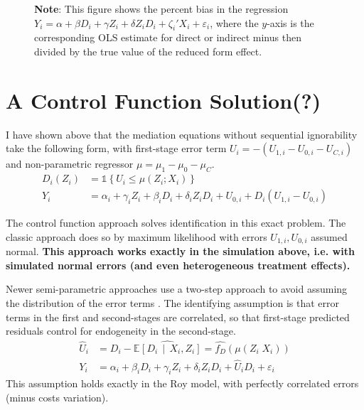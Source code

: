 \documentclass[a4paper, 12pt]{article}                                     %
\renewcommand{\vec}[1]{\boldsymbol{\mathit{#1}}}                           %
\newcommand{\Egiven}[3][]{\mathbb{E}_{#1} \left[ #2 \, \middle\vert \, #3 \right]} %
\newcommand{\indicator}[1]{\mathds{1}\left\{ #1 \right\}}                  %
\renewcommand{\hat}[1]{\widehat{#1}}                                       %
\begin{document}
\begin{figure}[H]
\begin{subfigure}[b]{0.495\textwidth}
        \label{fig:indirecteffect-bias}
    \end{subfigure}
    \label{fig:direct-indirect-effect-bias}
    \vspace{-1cm}
    \justify
    \footnotesize
    \textbf{Note}:
    This figure shows the percent bias in the regression $Y_i = \alpha + \beta D_i + \gamma Z_i + \delta Z_i D_i + \vec\zeta_i' \vec X_i + \varepsilon_i$, where the $y$-axis is the corresponding OLS estimate for direct or indirect minus then divided by the true value of the reduced form effect.
\end{figure}

\section{A Control Function Solution(?)}

I have shown above that the mediation equations without sequential ignorability take the following form, with first-stage error term $U_i = -( U_{1,i} - U_{0,i} - U_{C,i})$ and non-parametric regressor $\mu = \mu_1 - \mu_0 - \mu_C$. 
\begin{align*}
    D_i(Z_i) &= \indicator{U_i \leq \mu(Z_i ; \vec X_i)} \\
    Y_i &=\alpha_i + \gamma_i Z_i + \beta_i D_i + \delta_i Z_i D_i
            + U_{0,i} + D_i \left( U_{1,i} - U_{0,i} \right)
\end{align*}

The control function approach solves identification in this exact problem.
The classic \cite{heckman1979sample} approach does so by maximum likelihood with errors $U_{1,i}, U_{0,i}$ assumed normal.
\textbf{This approach works exactly in the simulation above, i.e. with simulated normal errors (and even heterogeneous treatment effects).}

Newer semi-parametric approaches use a two-step approach to avoid assuming the distribution of the error terms \citep{newey1999nonparametric,imbens2009identification}.
The identifying assumption is that error terms in the first and second-stages are correlated, so that first-stage predicted residuals control for endogeneity in the second-stage.
\begin{align*}
    \hat U_i &= D_i - \hat{\Egiven{D_i}{\vec X_i, Z_i}}
        = \hat{f_{D}}(\mu(Z_i \; \vec X_i)) \\
    Y_i &=\alpha_i + \beta_i D_i + \gamma_i Z_i + \delta_i Z_i D_i
            + \hat U_i D_i + \varepsilon_i
\end{align*}
This assumption holds exactly in the Roy model, with perfectly correlated errors (minus costs variation).
\end{document}
